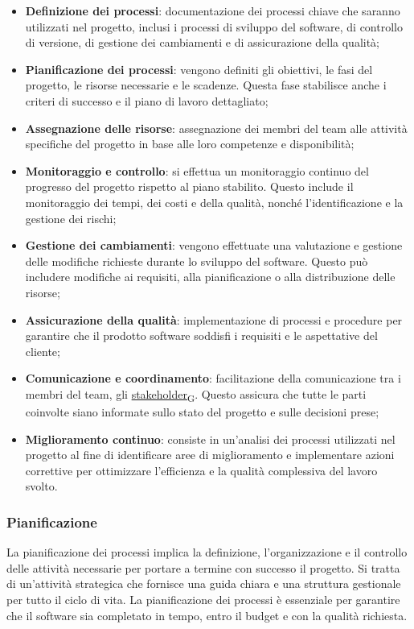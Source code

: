 \begin{itemize}
    \item \textbf{Definizione dei processi}: documentazione dei processi chiave che saranno utilizzati nel progetto, inclusi i processi di sviluppo del software, di controllo di versione, di gestione dei cambiamenti e di assicurazione della qualità;
    \item \textbf{Pianificazione dei processi}: vengono definiti gli obiettivi, le fasi del progetto, le risorse necessarie e le scadenze. Questa fase stabilisce anche i criteri di successo e il piano di lavoro dettagliato;
    \item \textbf{Assegnazione delle risorse}: assegnazione dei membri del team alle attività specifiche del progetto in base alle loro competenze e disponibilità;
    \item \textbf{Monitoraggio e controllo}: si effettua un monitoraggio continuo del progresso del progetto rispetto al piano stabilito. Questo include il monitoraggio dei tempi, dei costi e della qualità, nonché l'identificazione e la gestione dei rischi;
    \item \textbf{Gestione dei cambiamenti}: vengono effettuate una valutazione e gestione delle modifiche richieste durante lo sviluppo del software. Questo può includere modifiche ai requisiti, alla pianificazione o alla distribuzione delle risorse;
    \item \textbf{Assicurazione della qualità}: implementazione di processi e procedure per garantire che il prodotto software soddisfi i requisiti e le aspettative del cliente;
    \item \textbf{Comunicazione e coordinamento}: facilitazione della comunicazione tra i membri del team, gli \href{https://7last.github.io/docs/rtb/documentazione-interna/glossario\#stakeholder}{stakeholder\textsubscript{G}}. Questo assicura che tutte le parti coinvolte siano informate sullo stato del progetto e sulle decisioni prese;
    \item \textbf{Miglioramento continuo}: consiste in un'analisi dei processi utilizzati nel progetto al fine di identificare aree di miglioramento e implementare azioni correttive per ottimizzare l'efficienza e la qualità complessiva del lavoro svolto.
\end{itemize}

\subsubsection{Pianificazione}
La pianificazione dei processi implica la definizione, l'organizzazione e il controllo delle attività necessarie per portare a termine con successo il progetto. Si tratta di un'attività strategica che fornisce una guida chiara e una struttura gestionale per tutto il ciclo di vita. La pianificazione dei processi è essenziale per garantire che il software sia completato in tempo, entro il budget e con la qualità richiesta.

